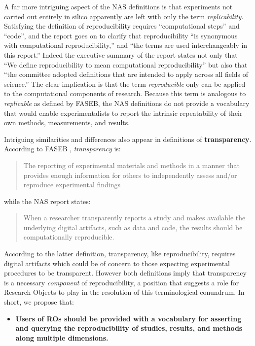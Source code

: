       A far more intriguing aspect of the NAS definitions \cite{committeeonreproducibilityandreplicabilityinscience2019reproducibility} is that experiments not carried out entirely in silico apparently are
      left with only the term \emph{replicability}.  Satisfying the definition of reproducibility requires ``computational steps'' and ``code'', and the report goes on to clarify
	that reproducibility ``is synonymous with computational reproducibility,''  and ``the terms are used interchangeably in this report.''
Indeed the executive summary of the report states not only that ``We define reproducibility to mean computational reproducibility''
	but also that ``the committee adopted definitions that are intended to apply across all fields of science.''
The clear implication is that the term \emph{reproducible} only can be applied to the computational components of research.
Because this term is analogous to \emph{replicable} as defined by FASEB, the NAS definitions do not provide a vocabulary 
	that would enable experimentalists to report the intrinsic repeatability of their own methods, measurements, and results. 

        Intriguing similarities and differences also appear in definitions of \textbf{transparency}. According to FASEB \cite{FASEB2016enhancing}, \emph{transparency} is: 
\begin{quote}
	The reporting of experimental materials and methods in a manner that provides enough information 
	for others to independently assess and/or reproduce experimental findings
      \end{quote}
while the NAS report \cite{committeeonreproducibilityandreplicabilityinscience2019reproducibility} states:
 \begin{quote}
	When a researcher transparently reports a study and makes available the underlying digital artifacts, such as data and code, 
	the results should be computationally reproducible.
      \end{quote}
 
\noindent According to the latter definition, transparency, like reproducibility, requires digital artifacts which could be of concern to
	those expecting experimental procedures to be transparent.
However both definitions imply that transparency is a necessary \emph{component} of reproducibility, a position that
	suggests a role for Research Objects to play in the resolution of this terminological conundrum.
        In short, we propose that:
        \begin{itemize}
        \item  \bf Users of ROs should be provided with a vocabulary for asserting and querying the reproducibility
          of studies, results, and methods along multiple dimensions.
      \end{itemize}

